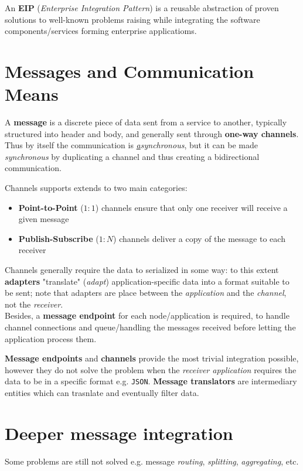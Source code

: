 An \textbf{EIP} (\textit{Enterprise Integration Pattern}) is a reusable abstraction of proven solutions to well-known problems raising while integrating the software components/services forming enterprise applicatioms.

\section{Messages and Communication Means}
A \textbf{message} is a discrete piece of data sent from a service to another, typically structured into header and body,
and generally sent through \textbf{one-way channels}.
Thus by itself the communication is \textit{\underline{a}synchronous}, but it can be made \textit{synchronous} by duplicating a channel and thus creating a bidirectional communication.

Channels supports extends to two main categories:
\begin{itemize}
   \item \textbf{Point-to-Point} ($1:1$) channels ensure that only one receiver will receive a given message
   \item \textbf{Publish-Subscribe} ($1:N$) channels deliver a copy of the message to each receiver
\end{itemize}

Channels generally require the data to serialized in some way: 
to this extent \textbf{adapters} "translate" (\textit{adapt}) application-specific data into a format suitable to be sent;
note that adapters are place between the \textit{application} and the \textit{channel}, not the \textit{receiver}.\\
Besides, a \textbf{message endpoint} for each node/application is required,
to handle channel connections and queue/handling the messages received before letting the application process them.\nl

\textbf{Message endpoints} and \textbf{channels} provide the most trivial integration possible,
however they do not solve the problem when the \textit{receiver application} requires the data to be in a specific format e.g. \texttt{JSON}.
\textbf{Message translators} are intermediary entities which can trasnlate and eventually filter data.

\section{Deeper message integration}
Some problems are still not solved e.g. message \textit{routing}, \textit{splitting}, \textit{aggregating}, etc.\nl

